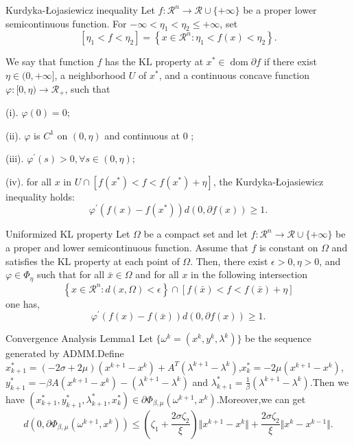 \documentclass[10pt,cjk]{beamer}
\begin{document}
	
	\begin{frame}{Kurdyka-Łojasiewicz inequality}
		Let $f: \mathcal{R}^n \rightarrow \mathcal{R} \cup\{+\infty\}$ be a proper lower semicontinuous function. For $-\infty<\eta_1<\eta_2 \leq+\infty$, set
		$$
		\left[\eta_1<f<\eta_2\right]=\left\{x \in \mathcal{R}^n: \eta_1<f\left(x\right)<\eta_2\right\} .
		$$
		
		We say that function $f$ has the $\mathrm{KL}$ property at $x^* \in \operatorname{dom} \partial f$ if there exist $\eta \in(0,+\infty]$, a neighborhood $U$ of $x^*$, and a continuous concave function $\varphi:[0, \eta) \rightarrow \mathcal{R}_{+}$, such that
		
		(i). $\varphi\left(0\right)=0$;
		
		(ii). $\varphi$ is $C^1$ on $\left(0, \eta\right)$ and continuous at 0 ;
		
		(iii). $\varphi^{\prime}\left(s\right)>0, \forall s \in\left(0, \eta\right)$;
		
		(iv). for all $x$ in $U \cap\left[f\left(x^*\right)<f<f\left(x^*\right)+\eta\right]$, the Kurdyka-Łojasiewicz inequality holds:
		$$
		\varphi^{\prime}\left(f\left(x\right)-f\left(x^*\right)\right) d\left(0, \partial f\left(x\right)\right) \ge 1 .
		$$
	\end{frame}
	
	\begin{frame}{Uniformized KL property}
		Let $\Omega$ be a compact set and let $f: \mathcal{R}^n \rightarrow \mathcal{R} \cup\{+\infty\}$ be a proper and lower semicontinuous function. Assume that $f$ is constant on $\Omega$ and satisfies the KL property at each point of $\Omega$. Then, there exist $\epsilon>0, \eta>0$, and $\varphi \in \Phi_\eta$ such that for all $\bar{x} \in \Omega$ and for all $x$ in the following intersection
		$$
		\left\{x \in \mathcal{R}^n: d\left(x, \Omega\right)<\epsilon\right\} \cap\left[f\left(\bar{x}\right)<f<f\left(\bar{x}\right)+\eta\right]
		$$
		one has,
		$$
		\varphi^{\prime}\left(f\left(x\right)-f\left(\bar{x}\right)\right) d\left(0, \partial f\left(x\right)\right) \geq 1 .
		$$
	\end{frame}
	
	\begin{frame}{Convergence Analysis Lemma1}
		Let $\{\omega^{k}=\left(x^{k},y^{k},\lambda^{k}\right)\}$ be the sequence generated by ADMM.Define $x_{k+1}^{*}=\left(-2\sigma+2\mu\right)\left(x^{k+1}-x^{k}\right)+A^{T}\left(\lambda^{k+1}-\lambda^{k}\right)$,$x_{k}^{*}=-2\mu\left(x^{k+1}-x^{k}\right)$,$y_{k+1}^{*}=-\beta A\left(x^{k+1}-x^{k}\right)-\left(\lambda^{k+1}-\lambda^{k}\right)$ and $\lambda_{k+1}^{*}=\frac{1}{\beta}\left(\lambda^{k+1}-\lambda^{k}\right)$.Then we have $\left(x_{k+1}^{*},y_{k+1}^{*},\lambda_{k+1}^{*},x_{k}^{*}\right)\in \partial\Phi_{\beta,\mu}\left(\omega^{k+1},x^{k}\right)$.Moreover,we can get
		$$d\left(0,\partial\Phi_{\beta,\mu}\left(\omega^{k+1},x^{k}\right)\right)\le\left(\zeta_{1}+\frac{2\sigma\zeta_{2}}{\xi}\right)\Vert x^{k+1}-x^{k}\Vert+\frac{2\sigma\zeta_{2}}{\xi}\Vert x^{k}-x^{k-1}\Vert.$$
	\end{frame}
	
\end{document}
